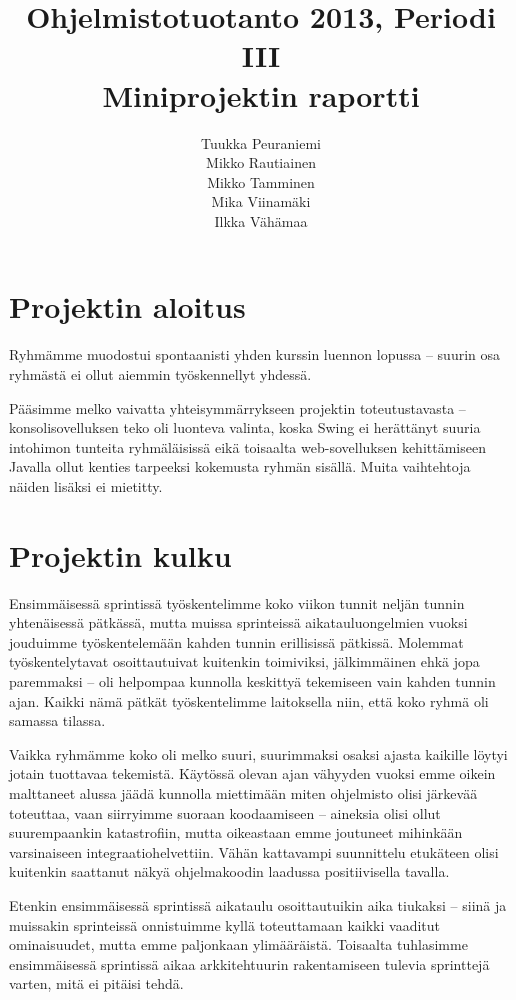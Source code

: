 \documentclass{article}
\title{Ohjelmistotuotanto 2013, Periodi III \\ Miniprojektin raportti}
\author{Tuukka Peuraniemi \\ Mikko Rautiainen \\ Mikko Tamminen \\ Mika Viinamäki \\ Ilkka Vähämaa}
\begin{document}
\begin{titlepage}
\maketitle
\end{titlepage}

\section{Projektin aloitus}

Ryhmämme muodostui spontaanisti yhden kurssin luennon lopussa -- suurin osa ryhmästä ei ollut aiemmin työskennellyt yhdessä.

Pääsimme melko vaivatta yhteisymmärrykseen projektin toteutustavasta -- konsolisovelluksen teko oli luonteva valinta, koska Swing ei herättänyt suuria intohimon tunteita ryhmäläisissä eikä toisaalta web-sovelluksen kehittämiseen Javalla ollut kenties tarpeeksi kokemusta ryhmän sisällä. Muita vaihtehtoja näiden lisäksi ei mietitty.

\section{Projektin kulku}

Ensimmäisessä sprintissä työskentelimme koko viikon tunnit neljän tunnin yhtenäisessä pätkässä, mutta muissa sprinteissä aikatauluongelmien vuoksi jouduimme työskentelemään kahden tunnin erillisissä pätkissä. Molemmat työskentelytavat osoittautuivat kuitenkin toimiviksi, jälkimmäinen ehkä jopa paremmaksi -- oli helpompaa kunnolla keskittyä tekemiseen vain kahden tunnin ajan. Kaikki nämä pätkät työskentelimme laitoksella niin, että koko ryhmä oli samassa tilassa.

Vaikka ryhmämme koko oli melko suuri, suurimmaksi osaksi ajasta kaikille löytyi jotain tuottavaa tekemistä. Käytössä olevan ajan vähyyden vuoksi emme oikein malttaneet alussa jäädä kunnolla miettimään miten ohjelmisto olisi järkevää toteuttaa, vaan siirryimme suoraan koodaamiseen -- aineksia olisi ollut suurempaankin katastrofiin, mutta oikeastaan emme joutuneet mihinkään varsinaiseen integraatiohelvettiin. Vähän kattavampi suunnittelu etukäteen olisi kuitenkin saattanut näkyä ohjelmakoodin laadussa positiivisella tavalla.

Etenkin ensimmäisessä sprintissä aikataulu osoittautuikin aika tiukaksi -- siinä ja muissakin sprinteissä onnistuimme kyllä toteuttamaan kaikki vaaditut ominaisuudet, mutta emme paljonkaan ylimääräistä. Toisaalta tuhlasimme ensimmäisessä sprintissä aikaa arkkitehtuurin rakentamiseen tulevia sprinttejä varten, mitä ei pitäisi tehdä.
\end{document}
